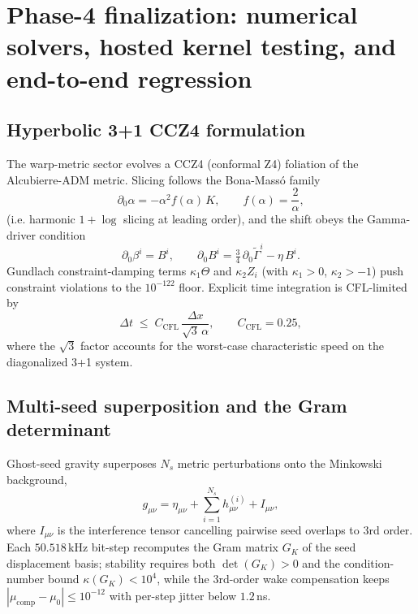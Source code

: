 \documentclass[aps,pra,10pt,onecolumn,superscriptaddress,nofootinbib,longbibliography,floatfix]{revtex4-2}
\begin{document}
\section{Phase-4 finalization: numerical solvers, hosted kernel testing, and end-to-end regression}\label{sec:phase4}

\subsection{Hyperbolic 3+1 CCZ4 formulation}

The warp-metric sector evolves a CCZ4 (conformal Z4) foliation of the
Alcubierre-ADM metric.  Slicing follows the Bona-Mass\'o family
\begin{equation}
\partial_0 \alpha = -\alpha^2 f(\alpha)\,K,\qquad
f(\alpha)=\frac{2}{\alpha},
\end{equation}
(i.e. harmonic $1{+}\log$ slicing at leading order), and the shift obeys the
Gamma-driver condition
\begin{equation}
\partial_0 \beta^i = B^i,\qquad
\partial_0 B^i = \tfrac{3}{4}\,\partial_0 \tilde\Gamma^i - \eta\,B^i .
\end{equation}
Gundlach constraint-damping terms $\kappa_1\Theta$ and $\kappa_2 Z_i$ (with
$\kappa_1>0$, $\kappa_2>-1$) push constraint violations to the
$10^{-122}$ floor.  Explicit time integration is CFL-limited by
\begin{equation}
\Delta t \;\le\; C_{\mathrm{CFL}}\,\frac{\Delta x}{\sqrt{3}\,\alpha},
\qquad C_{\mathrm{CFL}} = 0.25,
\end{equation}
where the $\sqrt{3}$ factor accounts for the worst-case characteristic speed
on the diagonalized 3+1 system.

\subsection{Multi-seed superposition and the Gram determinant}

Ghost-seed gravity superposes $N_s$ metric perturbations onto the Minkowski
background,
\begin{equation}
g_{\mu\nu} = \eta_{\mu\nu} + \sum_{i=1}^{N_s} h_{\mu\nu}^{(i)} + I_{\mu\nu},
\end{equation}
where $I_{\mu\nu}$ is the interference tensor cancelling pairwise seed
overlaps to 3rd order.  Each $50.518$\,kHz bit-step recomputes the Gram
matrix $G_K$ of the seed displacement basis; stability requires both
$\det(G_K)>0$ and the condition-number bound $\kappa(G_K)<10^{4}$, while the
3rd-order wake compensation keeps $|\mu_{\mathrm{comp}}-\mu_0|\le 10^{-12}$
with per-step jitter below $1.2$\,ns.
\end{document}
